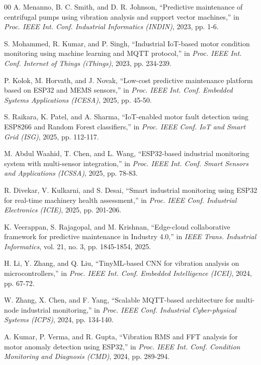 \documentclass[conference]{IEEEtran}
\begin{document}
\begin{thebibliography}{00}
 A. Menanno, B. C. Smith, and D. R. Johnson, ``Predictive maintenance of centrifugal pumps using vibration analysis and support vector machines,'' in \textit{Proc. IEEE Int. Conf. Industrial Informatics (INDIN)}, 2023, pp. 1-6.

 S. Mohammed, R. Kumar, and P. Singh, ``Industrial IoT-based motor condition monitoring using machine learning and MQTT protocol,'' in \textit{Proc. IEEE Int. Conf. Internet of Things (iThings)}, 2023, pp. 234-239.

 P. Kolok, M. Horvath, and J. Novak, ``Low-cost predictive maintenance platform based on ESP32 and MEMS sensors,'' in \textit{Proc. IEEE Int. Conf. Embedded Systems Applications (ICESA)}, 2025, pp. 45-50.

 S. Raikara, K. Patel, and A. Sharma, ``IoT-enabled motor fault detection using ESP8266 and Random Forest classifiers,'' in \textit{Proc. IEEE Conf. IoT and Smart Grid (ISG)}, 2025, pp. 112-117.

 M. Abdul Waahid, T. Chen, and L. Wang, ``ESP32-based industrial monitoring system with multi-sensor integration,'' in \textit{Proc. IEEE Int. Conf. Smart Sensors and Applications (ICSSA)}, 2025, pp. 78-83.

 R. Divekar, V. Kulkarni, and S. Desai, ``Smart industrial monitoring using ESP32 for real-time machinery health assessment,'' in \textit{Proc. IEEE Conf. Industrial Electronics (ICIE)}, 2025, pp. 201-206.

 K. Veerappan, S. Rajagopal, and M. Krishnan, ``Edge-cloud collaborative framework for predictive maintenance in Industry 4.0,'' in \textit{IEEE Trans. Industrial Informatics}, vol. 21, no. 3, pp. 1845-1854, 2025.

 H. Li, Y. Zhang, and Q. Liu, ``TinyML-based CNN for vibration analysis on microcontrollers,'' in \textit{Proc. IEEE Int. Conf. Embedded Intelligence (ICEI)}, 2024, pp. 67-72.

 W. Zhang, X. Chen, and F. Yang, ``Scalable MQTT-based architecture for multi-node industrial monitoring,'' in \textit{Proc. IEEE Conf. Industrial Cyber-physical Systems (ICPS)}, 2024, pp. 134-140.

 A. Kumar, P. Verma, and R. Gupta, ``Vibration RMS and FFT analysis for motor anomaly detection using ESP32,'' in \textit{Proc. IEEE Int. Conf. Condition Monitoring and Diagnosis (CMD)}, 2024, pp. 289-294.

\end{thebibliography}
\end{document}
